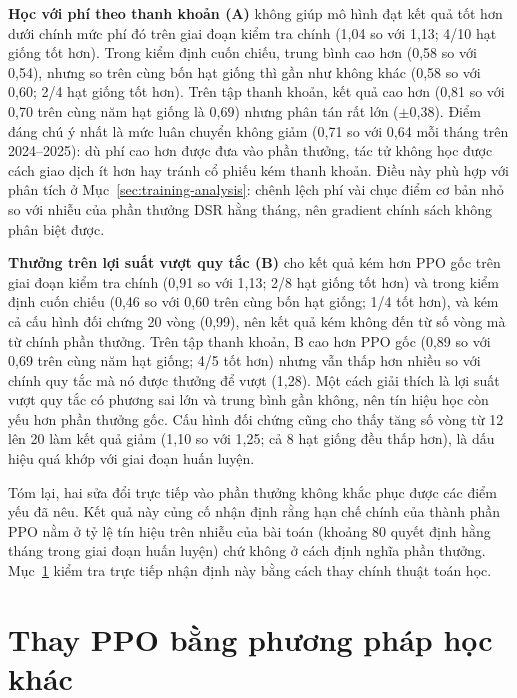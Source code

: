 \textbf{Học với phí theo thanh khoản (A)} không giúp mô hình đạt kết quả tốt hơn dưới chính mức phí đó trên giai đoạn kiểm tra chính (1,04 so với 1,13; 4/10 hạt giống tốt hơn). Trong kiểm định cuốn chiếu, trung bình cao hơn (0,58 so với 0,54), nhưng so trên cùng bốn hạt giống thì gần như không khác (0,58 so với 0,60; 2/4 hạt giống tốt hơn). Trên tập thanh khoản, kết quả cao hơn (0,81 so với 0,70 trên cùng năm hạt giống là 0,69) nhưng phân tán rất lớn ($\pm$0,38). Điểm đáng chú ý nhất là mức luân chuyển không giảm (0,71 so với 0,64 mỗi tháng trên 2024--2025): dù phí cao hơn được đưa vào phần thưởng, tác tử không học được cách giao dịch ít hơn hay tránh cổ phiếu kém thanh khoản. Điều này phù hợp với phân tích ở Mục~\ref{sec:training-analysis}: chênh lệch phí vài chục điểm cơ bản nhỏ so với nhiễu của phần thưởng DSR hằng tháng, nên gradient chính sách không phân biệt được.

\textbf{Thưởng trên lợi suất vượt quy tắc (B)} cho kết quả kém hơn PPO gốc trên giai đoạn kiểm tra chính (0,91 so với 1,13; 2/8 hạt giống tốt hơn) và trong kiểm định cuốn chiếu (0,46 so với 0,60 trên cùng bốn hạt giống; 1/4 tốt hơn), và kém cả cấu hình đối chứng 20 vòng (0,99), nên kết quả kém không đến từ số vòng mà từ chính phần thưởng. Trên tập thanh khoản, B cao hơn PPO gốc (0,89 so với 0,69 trên cùng năm hạt giống; 4/5 tốt hơn) nhưng vẫn thấp hơn nhiều so với chính quy tắc mà nó được thưởng để vượt (1,28). Một cách giải thích là lợi suất vượt quy tắc có phương sai lớn và trung bình gần không, nên tín hiệu học còn yếu hơn phần thưởng gốc. Cấu hình đối chứng cũng cho thấy tăng số vòng từ 12 lên 20 làm kết quả giảm (1,10 so với 1,25; cả 8 hạt giống đều thấp hơn), là dấu hiệu quá khớp với giai đoạn huấn luyện.

Tóm lại, hai sửa đổi trực tiếp vào phần thưởng không khắc phục được các điểm yếu đã nêu. Kết quả này củng cố nhận định rằng hạn chế chính của thành phần PPO nằm ở tỷ lệ tín hiệu trên nhiễu của bài toán (khoảng 80 quyết định hằng tháng trong giai đoạn huấn luyện) chứ không ở cách định nghĩa phần thưởng. Mục~\ref{sec:algo} kiểm tra trực tiếp nhận định này bằng cách thay chính thuật toán học.

\section{Thay PPO bằng phương pháp học khác}
\label{sec:algo}

